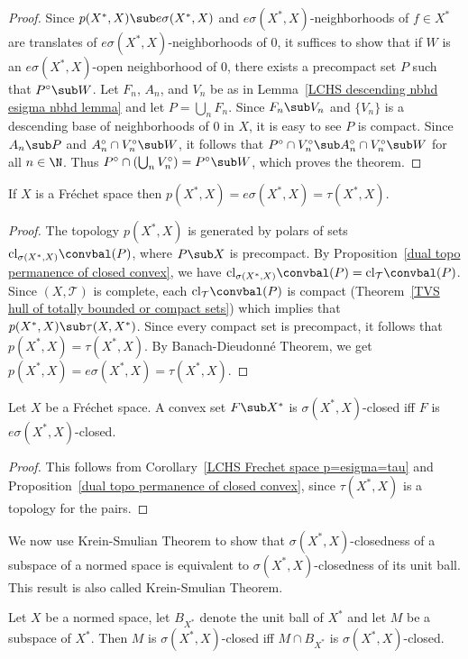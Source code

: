\begin{proof}
Since $p(X^*,X)\sub e\sigma(X^*,X)$ and $e\sigma(X^*,X)$-neighborhoods of $f\in X^*$ are translates of $e\sigma(X^*,X)$-neighborhoods of $0$, it suffices to show that if $W$ is an $e\sigma(X^*,X)$-open neighborhood of 0, there exists a precompact set $P$ such that $P^\circ\sub W$. Let $F_n$, $A_n$, and $V_n$ be as in Lemma~\ref{LCHS descending nbhd esigma nbhd lemma} and let $P=\bigcup_nF_n$. Since $F_n\sub V_n$ and $\{V_n\}$ is a descending base of neighborhoods of $0$ in $X$, it is easy to see $P$ is compact. Since $A_n\sub P$ and $A_n^\circ\cap V_n^\circ\sub W$, it follows that $P^\circ\cap V_n^\circ\sub A_n^\circ\cap V_n^\circ\sub W$ for all $n\in\N$. Thus $P^\circ\cap(\bigcup_nV_n^\circ)=P^\circ\sub W$, which proves the theorem.
\end{proof}
\begin{corollary}\label{LCHS Frechet space p=esigma=tau}
If $X$ is a Fr\'echet space then $p(X^*,X)=e\sigma(X^*,X)=\tau(X^*,X)$.
\end{corollary}
\begin{proof}
The topology $p(X^*,X)$ is generated by polars of sets $\mathrm{cl}_{\sigma(X^*,X)}\convbal(P)$, where $P\sub X$ is precompact. By Proposition~\ref{dual topo permanence of closed convex}, we have $\mathrm{cl}_{\sigma(X^*,X)}\convbal(P)=\mathrm{cl}_{\mathcal{T}}\convbal(P)$. Since $(X,\mathcal{T})$ is complete, each $\mathrm{cl}_{\mathcal{T}}\convbal(P)$ is compact (Theorem~\ref{TVS hull of totally bounded or compact sets}) which implies that $p(X^*,X)\sub\tau(X,X^*)$. Since every compact set is precompact, it follows that $p(X^*,X)=\tau(X^*,X)$. By Banach-Dieudonn\'e Theorem, we get $p(X^*,X)=e\sigma(X^*,X)=\tau(X^*,X)$.
\end{proof}
\begin{theorem}
Let $X$ be a Fr\'echet space. A convex set $F\sub X^*$ is $\sigma(X^*,X)$-closed iff $F$ is $e\sigma(X^*,X)$-closed.
\end{theorem}
\begin{proof}
This follows from Corollary~\ref{LCHS Frechet space p=esigma=tau} and Proposition~\ref{dual topo permanence of closed convex}, since $\tau(X^*,X)$ is a topology for the pairs.
\end{proof}
We now use Krein-Smulian Theorem to show that $\sigma(X^*,X)$-closedness of a subspace of a normed space is equivalent to $\sigma(X^*,X)$-closedness of its unit ball. This result is also called Krein-Smulian Theorem.
\begin{theorem}
Let $X$ be a normed space, let $B_{X^*}$ denote the unit ball of $X^*$ and let $M$ be a subspace of $X^*$. Then $M$ is $\sigma(X^*,X)$-closed iff $M\cap B_{X^*}$ is $\sigma(X^*,X)$-closed.
\end{theorem}
